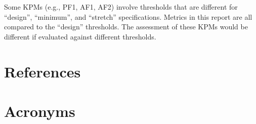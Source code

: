 \documentclass[DM,toc]{lsstdoc}
\begin{document}
Some KPMs (e.g., PF1, AF1, AF2) involve thresholds that are different for ``design'', ``minimum'', and ``stretch'' specifications. Metrics in this report are all compared to the ``design'' thresholds. The assessment of these KPMs would be different if evaluated against different thresholds.


\appendix

\section{References} \label{sec:bib}
\renewcommand{\refname}{} %


\section{Acronyms} \label{sec:acronyms}

\end{document}
